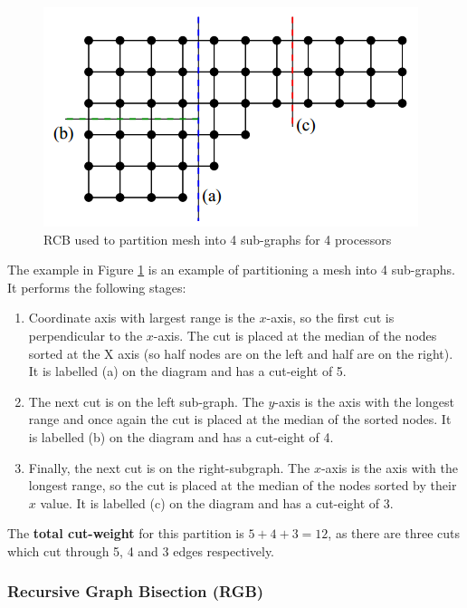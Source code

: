 \documentclass{article}
\begin{document}
\begin{figure}
	\centering
	\includegraphics[scale=0.35]{figures/rcb-example.png}
	\caption{RCB used to partition mesh into 4 sub-graphs for 4 processors}
	\label{fig:rcb-example}
\end{figure}

The example in Figure \ref{fig:rcb-example} is an example of partitioning a mesh into 4 sub-graphs. It performs the following stages:
\begin{enumerate}
	\item Coordinate axis with largest range is the $x$-axis, so the first cut is perpendicular to the $x$-axis. The cut is placed at the median of the nodes sorted at the X axis (so half nodes are on the left and half are on the right). It is labelled (a) on the diagram and has a cut-eight of 5.
	\item The next cut is on the left sub-graph. The $y$-axis is the axis with the longest range and once again the cut is placed at the median of the sorted nodes. It is labelled (b) on the diagram and has a cut-eight of 4.
	\item Finally, the next cut is on the right-subgraph. The $x$-axis is the axis with the longest range, so the cut is placed at the median of the nodes sorted by their $x$ value. It is labelled (c) on the diagram and has a cut-eight of 3.
\end{enumerate}

The \textbf{total cut-weight} for this partition is $5 + 4 + 3 = 12$, as there are three cuts which cut through 5, 4 and 3 edges respectively.

\subsubsection{Recursive Graph Bisection (RGB)}
\end{document}

